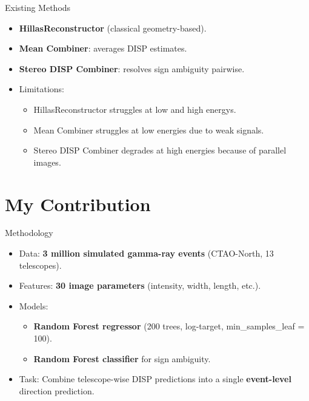 \documentclass[aspectratio=1610, 9pt]{beamer}
\begin{document}

\begin{frame}{Existing Methods}
  \begin{itemize}
    \setlength{\itemsep}{0.5cm} %
    \item \textbf{HillasReconstructor} (classical geometry-based).  
    \item \textbf{Mean Combiner}: averages DISP estimates.  
    \item \textbf{Stereo DISP Combiner}: resolves sign ambiguity pairwise.  
    \item Limitations:  
      \begin{itemize}
        \setlength{\itemsep}{0.3cm} %
        \item HillasReconstructor struggles at low and high energys.
        \item Mean Combiner struggles at low energies due to weak signals.  
        \item Stereo DISP Combiner degrades at high energies because of parallel images.  
      \end{itemize}
  \end{itemize}
\end{frame}


\section{My Contribution}
\begin{frame}{Methodology}
  \begin{itemize}
    \setlength{\itemsep}{0.5cm} %
    \item Data: \textbf{3 million simulated gamma-ray events} (CTAO-North, 13 telescopes).  
    \item Features: \textbf{30 image parameters} (intensity, width, length, etc.).  
    \item Models:  
      \begin{itemize}
        \setlength{\itemsep}{0.3cm} %
        \item \textbf{Random Forest regressor} (200 trees, log-target, min\_samples\_leaf = 100).  
        \item \textbf{Random Forest classifier} for sign ambiguity.  
      \end{itemize}
    \item Task: Combine telescope-wise DISP predictions into a single \textbf{event-level} direction prediction. 
  \end{itemize}
\end{frame}
\end{document}
